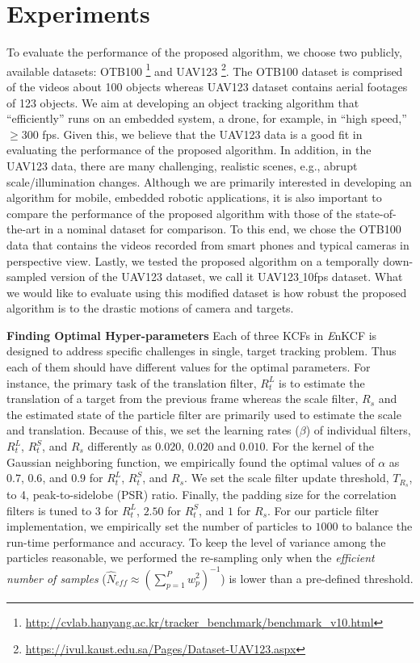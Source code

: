 \documentclass[10pt,twocolumn,letterpaper]{article}
\begin{document}
\section{Experiments} \label{sc:Experiments}
To evaluate the performance of the proposed algorithm, we choose two
publicly, available datasets:
OTB100 \footnote{\url{http://cvlab.hanyang.ac.kr/tracker_benchmark/benchmark_v10.html}}
and
UAV123 \footnote{\url{https://ivul.kaust.edu.sa/Pages/Dataset-UAV123.aspx}}\cite{mueller2016uav123}.
The OTB100 dataset is comprised of the videos about 100 objects
whereas UAV123 dataset contains aerial footages of 123 objects. We aim
at developing an object tracking algorithm that ``efficiently'' runs
on an embedded system, a drone, for example, in ``high speed,'' $\ge
300$ fps. Given this, we believe that the UAV123 data is a good fit in
evaluating the performance of the proposed algorithm. In addition, in
the UAV123 data, there are many challenging, realistic scenes, e.g.,
abrupt scale/illumination changes. Although we are primarily
interested in developing an algorithm for mobile, embedded robotic
applications, it is also important to compare the performance of the
proposed algorithm with those of the state-of-the-art in a nominal
dataset for comparison. To this end, we chose the OTB100 data that
contains the videos recorded from smart phones and typical cameras in
perspective view. Lastly, we tested the proposed algorithm on a
temporally down-sampled version of the UAV123 dataset, we call it
UAV123$\_$10fps dataset. What we would like to evaluate using this
modified dataset is how robust the proposed algorithm is to the
drastic motions of camera and targets.

\textbf{Finding Optimal Hyper-parameters} Each of three KCFs in {\it
  E}nKCF is designed to address specific challenges in single, target
tracking problem. Thus each of them should have different values for
the optimal parameters. For instance, the primary task of the
translation filter, $R_{t}^{L}$ is to estimate the translation of a
target from the previous frame whereas the scale filter, $R_{s}$ and
the estimated state of the particle filter are primarily used to
estimate the scale and translation. Because of this, we set the
learning rates ($\beta$) of individual filters, $R_{t}^{L}$,
$R_{t}^{S}$, and $R_{s}$ differently as $0.020$, $0.020$ and
$0.010$. For the kernel of the Gaussian neighboring function, we
empirically found the optimal values of $\alpha$ as $0.7$, $0.6$, and
$0.9$ for $R_{t}^{L}$, $R_{t}^{S}$, and $R_{s}$. We set the scale
filter update threshold, $T_{R_{s}}$, to 4, peak-to-sidelobe (PSR)
ratio. Finally, the padding size for the correlation filters is tuned
to $3$ for $R_{t}^{L}$, $2.50$ for $R_{t}^{S}$, and $1$ for
$R_{s}$. For our particle filter implementation, we empirically set
the number of particles to $1000$ to balance the run-time performance
and accuracy. To keep the level of variance among the particles
reasonable, we performed the re-sampling only when the
\textit{efficient number of samples} ($ \hat{N}_{eff} \approx
(\sum_{p=1}^{P}w_{p}^{2})^{-1} $) is lower than a pre-defined
threshold.
\end{document}
